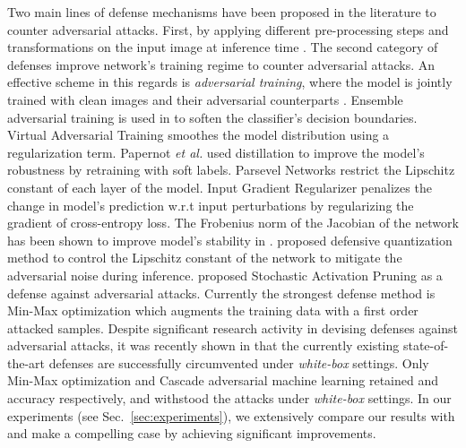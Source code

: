 \documentclass[10pt,twocolumn,letterpaper]{article}
\begin{document}
Two main lines of defense mechanisms have been proposed in the literature to counter adversarial attacks. First, by applying different pre-processing steps and transformations on the input image at inference time \cite{xie2017mitigating,guo2017countering}. The second category of defenses improve network's training regime to counter adversarial attacks. An effective scheme in this regards is \textit{adversarial training}, where the model is jointly trained with clean images and their adversarial counterparts \cite{kurakin2016adversarial_2, 43405}. Ensemble adversarial training is used in \cite{tramer2017ensemble} to soften the classifier's decision boundaries. Virtual Adversarial Training \cite{miyato2015distributional} smoothes the model distribution using a regularization term. Papernot \textit{et al.} \cite{papernot2016distillation} used distillation to improve the model's robustness by retraining with soft labels. Parsevel Networks \cite{cisse2017parseval} restrict the Lipschitz constant of each layer of the model. Input Gradient Regularizer \cite{ross2018improving} penalizes the change in model's prediction w.r.t input perturbations by regularizing the gradient of cross-entropy loss. The Frobenius norm of the Jacobian of the network has been shown to improve model's stability in \cite{jakubovitz2018improving}. \cite{lin2018defensive} proposed defensive quantization method to control the Lipschitz constant of the network to mitigate the adversarial noise during inference. \cite{dhillon2018stochastic} proposed Stochastic Activation Pruning as a defense against adversarial attacks. Currently the strongest defense method is Min-Max optimization \cite{madry2017towards} which augments the training data with a first order attacked samples. Despite significant research activity in devising defenses against adversarial attacks, it was recently shown in \cite{athalye2018obfuscated} that the currently existing state-of-the-art defenses \cite{kolter2017provable,raghunathan2018certified,sinha2017certifiable} are successfully circumvented under \textit{white-box} settings. Only Min-Max optimization \cite{madry2017towards} and Cascade adversarial machine learning \cite{na2017cascade} retained  and  accuracy respectively, and withstood the attacks under \textit{white-box} settings. In our experiments (see Sec.~\ref{sec:experiments}), we extensively compare our results with \cite{madry2017towards} and make a compelling case by achieving significant improvements.
\end{document}
